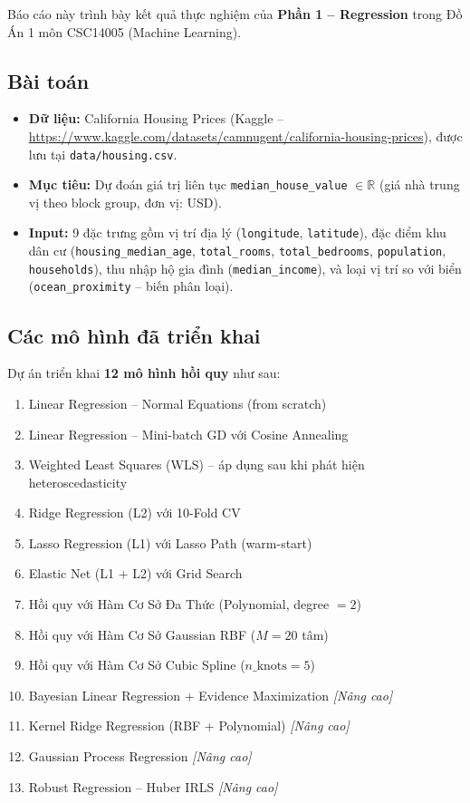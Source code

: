 \documentclass[12pt,a4paper]{article}
\begin{document}
Báo cáo này trình bày kết quả thực nghiệm của \textbf{Phần 1 -- Regression} trong Đồ Án 1
môn CSC14005 (Machine Learning).

\subsection{Bài toán}
\begin{itemize}
  \item \textbf{Dữ liệu:} California Housing Prices (Kaggle -- \url{https://www.kaggle.com/datasets/camnugent/california-housing-prices}), được lưu tại \texttt{data/housing.csv}.
  \item \textbf{Mục tiêu:} Dự đoán giá trị liên tục \texttt{median\_house\_value} $\in \mathbb{R}$ (giá nhà trung vị theo block group, đơn vị: USD).
  \item \textbf{Input:} 9 đặc trưng gồm vị trí địa lý (\texttt{longitude}, \texttt{latitude}), đặc điểm khu dân cư (\texttt{housing\_median\_age}, \texttt{total\_rooms}, \texttt{total\_bedrooms}, \texttt{population}, \texttt{households}), thu nhập hộ gia đình (\texttt{median\_income}), và loại vị trí so với biển (\texttt{ocean\_proximity} -- biến phân loại).
\end{itemize}

\subsection{Các mô hình đã triển khai}
Dự án triển khai \textbf{12 mô hình hồi quy} như sau:
\begin{enumerate}
  \item Linear Regression -- Normal Equations (from scratch)
  \item Linear Regression -- Mini-batch GD với Cosine Annealing
  \item Weighted Least Squares (WLS) -- áp dụng sau khi phát hiện heteroscedasticity
  \item Ridge Regression (L2) với 10-Fold CV
  \item Lasso Regression (L1) với Lasso Path (warm-start)
  \item Elastic Net (L1 + L2) với Grid Search
  \item Hồi quy với Hàm Cơ Sở Đa Thức (Polynomial, degree $= 2$)
  \item Hồi quy với Hàm Cơ Sở Gaussian RBF ($M = 20$ tâm)
  \item Hồi quy với Hàm Cơ Sở Cubic Spline ($n\_\text{knots} = 5$)
  \item Bayesian Linear Regression + Evidence Maximization \textit{[Nâng cao]}
  \item Kernel Ridge Regression (RBF + Polynomial) \textit{[Nâng cao]}
  \item Gaussian Process Regression \textit{[Nâng cao]}
  \item Robust Regression -- Huber IRLS \textit{[Nâng cao]}
\end{enumerate}
\end{document}
